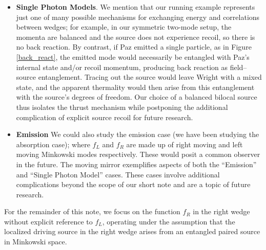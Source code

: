 \documentclass[12pt,a4paper]{article}
\begin{document}
{\begin{itemize}
\item {\bf Single Photon Models}. We mention that our running example represents just one of many possible mechanisms for exchanging energy and correlations between wedges; for example, in our symmetric two-mode setup, the momenta are balanced and the source does not experience recoil, so there is no back reaction. By contrast, if Paz emitted a single particle, as in Figure \ref{back_react}, the emitted mode would necessarily be entangled with Paz’s internal state and/or recoil momentum, producing back reaction as field–source entanglement. Tracing out the source would leave Wright with a mixed state, and the apparent thermality would then arise from this entanglement with the source’s degrees of freedom. Our choice of a balanced bilocal source thus isolates the thrust mechanism while postponing the additional complication of explicit source recoil for future research.

\item {\bf Emission} We could also study the emission case (we have been studying the absorption case); where $f_L$ and $f_R$ are made up of right moving and left moving Minkowski modes respectively.  These would posit a common observer in the future. The moving mirror \cite{fulling1976radiation} exemplifies aspects of both the ``Emission'' and ``Single Photon Model'' cases. These cases involve additional complications beyond the scope of our short note and are a topic of future research.
\end{itemize}

For the remainder of this note, we focus on the function $f_R$ in the right wedge without explicit reference to $f_L$, operating under the assumption that the localized driving source in the right wedge arises from an entangled paired source in Minkowski space.

}
\end{document}
